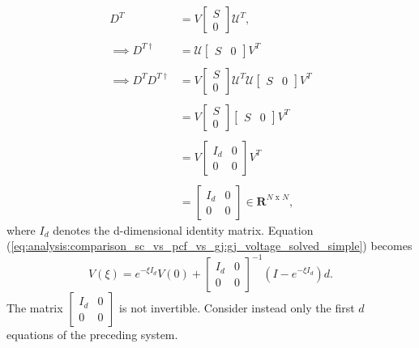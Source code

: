 \begin{align*}
	D^T
	&=
	V \begin{bmatrix} S \\ 0\end{bmatrix} \mathcal{U}^T,
	\\
	\\
	\implies
	D^{T \dagger}
	&= 
	\mathcal{U} \begin{bmatrix} S & 0\end{bmatrix} V^T
	\\
	\\
	\implies 
	D^T D^{T \dagger} 
	&=
	V \begin{bmatrix} S \\ 0\end{bmatrix} \mathcal{U}^T \mathcal{U} \begin{bmatrix} S & 0\end{bmatrix} V^T
	\\
	\\
	&=
	V \begin{bmatrix} S \\ 0\end{bmatrix} \begin{bmatrix} S & 0\end{bmatrix} V^T
	\\
	\\
	&= V \begin{bmatrix} I_{d} & 0 \\ 0 & 0 \end{bmatrix}  V^T
	\\
	\\
	&= \begin{bmatrix} I_{d} & 0 \\ 0 & 0 \end{bmatrix} \in \mathbf{R}^{N \text{ x } N},
\end{align*}
where $I_{d}$ denotes the d-dimensional identity matrix. Equation (\ref{eq:analysis:comparison_sc_vs_pcf_vs_gj:gj_voltage_solved_simple}) becomes
\\
$$
	V(\xi)
	=
	 e^{-\xi I_d } V(0)
	+
	\begin{bmatrix} I_{d} & 0 \\ 0 & 0 \end{bmatrix}^{-1}
	\left(
		I - e^{-\xi I_d}
	\right)
	d.
$$
The matrix $\begin{bmatrix} I_{d} & 0 \\ 0 & 0 \end{bmatrix}$ is not invertible. Consider instead only the first $d$ equations of the preceding system. 

